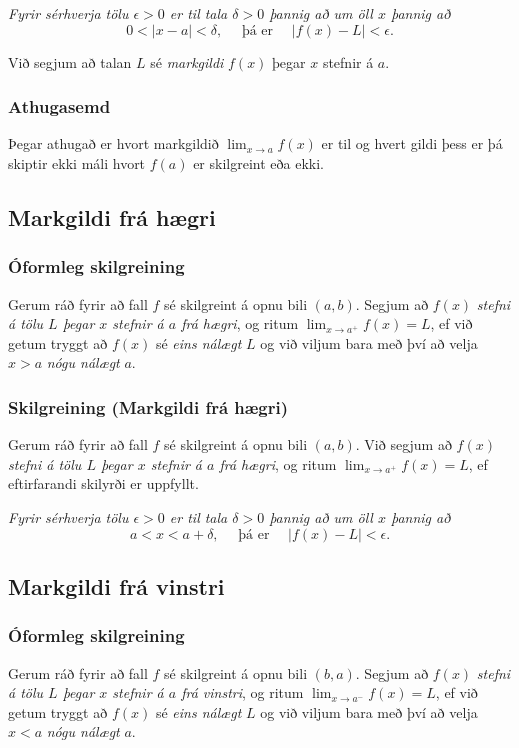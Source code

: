 \documentclass[icelandic,a4paper,12pt]{article}
\begin{document}
\emph{Fyrir sérhverja tölu $\epsilon>0$ er til tala $\delta>0$ 
þannig að um öll $x$ þannig að}
$$
0<|x-a|<\delta,\quad \text{ þá er } \quad |f(x)-L|<\epsilon.
$$

Við segjum að talan $L$ sé \emph{markgildi} $f(x)$ þegar $x$ stefnir á $a$.

\pause

\subsubsection{Athugasemd}  Þegar athugað er hvort markgildið
$\lim_{x\rightarrow a} f(x)$ er til og hvert gildi þess er þá skiptir
ekki máli hvort $f(a)$ er skilgreint eða ekki.

\subsection{Markgildi frá hægri}
\subsubsection{Óformleg skilgreining}   
Gerum ráð fyrir að fall $f$ sé
skilgreint á opnu bili $(a,b)$.  Segjum að  $f(x)$
{\it stefni á tölu $L$ þegar $x$ stefnir á $a$ frá hægri}, og ritum
$\lim_{x\rightarrow a^+} f(x)=L$, ef við getum tryggt að  $f(x)$ sé 
\emph{eins nálægt}
$L$ og við viljum bara með því að velja $x>a$ \emph{nógu nálægt} $a$. 

\pause

\subsubsection{Skilgreining (Markgildi frá hægri)} Gerum ráð fyrir að fall $f$ sé
skilgreint á opnu bili $(a,b)$.  Við segjum að $f(x)$
{\it stefni á tölu $L$ þegar $x$ stefnir á $a$ frá hægri}, og ritum
$\lim_{x\rightarrow a^+} f(x)=L$, ef eftirfarandi skilyrði er uppfyllt.

{\it Fyrir sérhverja tölu $\epsilon>0$ er til tala $\delta>0$ þannig 
að um öll $x$ þannig að} 
$$
a<x<a+\delta,\quad \text{ þá er } \quad |f(x)-L|<\epsilon.
$$

\subsection{Markgildi frá vinstri}
\subsubsection{Óformleg skilgreining}   
Gerum ráð fyrir að fall $f$ sé
skilgreint á opnu bili $(b,a)$.  Segjum að  $f(x)$
{\it stefni á tölu $L$ þegar $x$ stefnir á $a$ frá vinstri}, og ritum
$\lim_{x\rightarrow a^-} f(x)=L$, ef við getum tryggt að  $f(x)$ sé 
\emph{eins nálægt}
$L$ og við viljum bara með því að velja $x<a$ \emph{nógu nálægt} $a$. 
\end{document}
